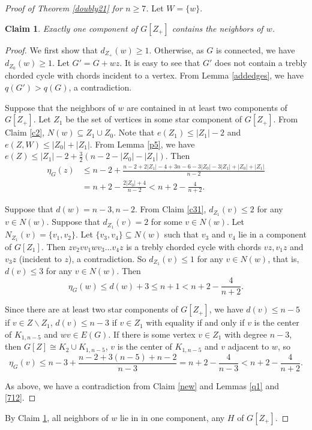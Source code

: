 \documentclass[12pt]{article}
\newtheorem {claim}{Claim}[section]
\begin{document}
\begin{proof}[Proof of Theorem \ref{doubly21} for $n\ge 7$]
Let $W=\{w\}$.



\begin{claim}\label{6662}
Exactly one component of $G[Z_+]$ contains the neighbors of $w$.
\end{claim}
\begin{proof}
We first show that $d_{Z_+}(w)\ge 1$. Otherwise, as $G$ is connected, we have $d_{Z_0}(w)\ge 1$.
Let $G'=G+wz$.
It is easy to see that $G'$ does not contain a trebly chorded cycle with chords incident to a vertex.
From Lemma \ref{addedges}, we have $q(G')>q(G)$, a contradiction.

Suppose that the neighbors of $w$ are contained in at least two components of $G[Z_+]$.
Let $Z_1$ be the set of vertices in some  star component of $G[Z_+]$.
From Claim \ref{c2}, $N(w)\subseteq Z_1\cup Z_0$.
Note that $e(Z_1)\le |Z_1|-2$ and $e(Z,W)\le |Z_0|+|Z_1|$.
From Lemma \ref{p5}, we have $e(Z)\le |Z_1|-2+\frac{3}{2}(n-2-|Z_0|-|Z_1|)$.
Then
\begin{align*}
\eta_G(z)&\le n-2+\frac{n-2+2|Z_1|-4+3n-6-3|Z_0|-3|Z_1|+|Z_0|+|Z_1|}{n-2}\\
&=n+2-\frac{2|Z_0|+4}{n-2}<n+2-\frac{4}{n+2}.
\end{align*}

Suppose that  $d(w)=n-3,n-2$.
From Claim \ref{c31}, $d_{Z_1}(v)\le 2$ for any $v\in N(w)$. Suppose that $d_{Z_1}(v)=2$ for some $v\in N(w)$. Let $N_{Z_1}(v)=\{v_1,v_2\}$.   Let $\{v_3,v_4\}\subseteq N(w)$ such that $v_3$ and $v_4$ lie in a component of $G[Z_1]$.
Then $zv_2vv_1wv_3\dots v_4z$ is a trebly chorded cycle with chords $vz, v_1z$ and $v_3z$ (incident to $z$), a contradiction. So $d_{Z_1}(v)\le 1$ for any $v\in N(w)$, that is,
$d(v)\le 3$ for any $v\in N(w)$.
Then
\[
\eta_G(w)\le d(w)+3\le n+1<n+2-\frac{4}{n+2}.
\]

Since there are at least two star components of $G[Z_+]$,  we have $d(v)\le n-5$ if $v\in Z\backslash Z_1$, $d(v)\le n-3$ if $v\in Z_1$ with equality if and only if $v$ is the center of $K_{1,n-5}$ and $wv\in E(G)$.
If there is some vertex $v\in Z_1$ with degree $n-3$, then $G[Z]\cong K_2\cup K_{1,n-5}$, $v$ is the center of $K_{1,n-5}$ and $v$ adjacent to $w$,
so
\[
\eta_G(v)\le n-3+\frac{n-2+3(n-5)+n-2}{n-3}=n+2-\frac{4}{n-3}<n+2-\frac{4}{n+2}.
\]

As above, we have a contradiction from Claim \ref{new} and Lemmas \ref{q1} and \ref{712}.
\end{proof}

By Claim \ref{6662}, all neighbors of $w$ lie in in one component, any $H$
of  $G[Z_+]$.


\end{proof}
\end{document}
